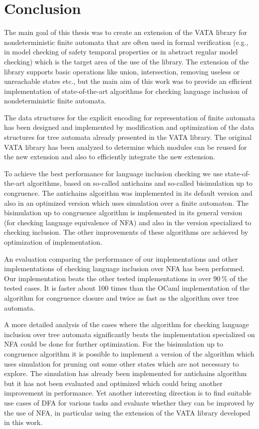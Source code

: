 \chapter{Conclusion}
\label{concl}
The main goal of this thesis was to create an extension of the VATA library for nondeterministic finite automata 
that are often used in formal verification (e.g., in model checking of safety temporal properties or in 
abstract regular model checking) which is the target area of the use of the library. The extension of the library supports
basic operations like union, intersection, removing useless or unreachable states etc., but the main aim of this work was to provide
an efficient implementation of state-of-the-art algorithms for checking language inclusion of nondeterministic finite automata.

The data structures for the explicit encoding for representation of finite automata has been designed
and implemented by modification and optimization of the data structures for tree automata already presented in the VATA library. 
The original VATA library has been analyzed to determine
which modules can be reused for the new extension and also to efficiently integrate the new extension.

To achieve the best performance for language inclusion checking we use state-of-the-art algorithms, based on so-called antichains and so-called bisimulation
up to congruence. The antichains algorithm was implemented in its default version and also in an optimized version which uses simulation over a finite automaton. 
The bisimulation up to congruence algorithm is implemented in its general version (for checking language equivalence of NFA) and also in
the version specialized to checking inclusion. %
The other improvements of these algorithms are achieved by optimization of implementation.

An evaluation comparing the performance of our implementations and other implementations of checking language inclusion over NFA has been performed.
Our implementation beats the other tested implementations in over 90\,\% of the tested cases. It is faster about 100 times than the OCaml implementation of the
algorithm for congruence closure and twice as fast as the algorithm over tree automata.

A more detailed analysis of the cases where the algorithm for checking language inclusion over tree automata significantly 
beats the implementation specialized on NFA could be done for further optimization. 
For the bisimulation up to congruence algorithm it is possible to implement a version of the algorithm 
which uses simulation for pruning out some other states which are not necessary to explore. The simulation has already been implemented for antichains 
algorithm but it has not been evaluated and optimized which could bring another improvement in performance. 
Yet another interesting direction is to find suitable use cases of DFA for various tasks and evaluate whether they can be improved by the use of NFA, in
particular using the extension of the VATA library developed in this work.
